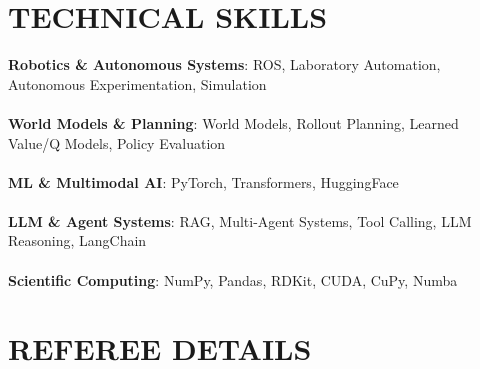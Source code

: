 \documentclass[letterpaper,11pt]{article}
\newcommand{\resumeSubHeadingListStart}{\begin{itemize}[leftmargin=0.15in, label={}]}
\newcommand{\resumeSubHeadingListEnd}{\end{itemize}}
\begin{document}
\section{\textbf{TECHNICAL SKILLS}}
\resumeSubHeadingListStart
{\item{
\textbf{\textcolor[HTML]{4775BA}{Robotics \& Autonomous Systems}}: ROS, Laboratory Automation, Autonomous Experimentation, Simulation \\\\
\textbf{\textcolor[HTML]{4775BA}{World Models \& Planning}}: World Models, Rollout Planning, Learned Value/Q Models, Policy Evaluation \\\\
\textbf{\textcolor[HTML]{4775BA}{ML \& Multimodal AI}}: PyTorch, Transformers, HuggingFace \\\\
\textbf{\textcolor[HTML]{4775BA}{LLM \& Agent Systems}}: RAG, Multi-Agent Systems, Tool Calling, LLM Reasoning, LangChain \\\\
\textbf{\textcolor[HTML]{4775BA}{Scientific Computing}}: NumPy, Pandas, RDKit, CUDA, CuPy, Numba
}}
\resumeSubHeadingListEnd




\section{\textbf{REFEREE DETAILS}}
\vspace{0.4em}
\end{document}
